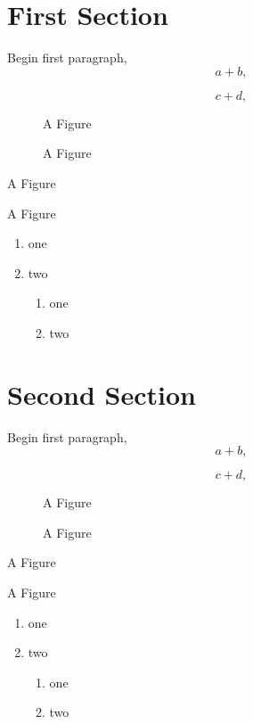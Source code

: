 \documentclass{article}
\begin{document}
\section{First Section}
Begin first paragraph,
\begin{equation}
 a + b,
\end{equation}

\begin{equation}
 c + d,
\end{equation}

\begin{figure}
A Figure
\caption{A Figure}
\end{figure}

\begin{table}
A Figure
\caption{A Figure}
\end{table}

\begin{enumerate}
 \item one
 \item two
   \begin{enumerate}
    \item one
    \item two
   \end{enumerate}
\end{enumerate}

\section{Second Section}
Begin first paragraph,
\begin{equation}
 a + b,
\end{equation}

\begin{equation}
 c + d,
\end{equation}

\begin{figure}
A Figure
\caption{A Figure}
\end{figure}

\begin{table}
A Figure
\caption{A Figure}
\end{table}

\begin{enumerate}
 \item one
 \item two
   \begin{enumerate}
    \item one
    \item two
   \end{enumerate}
\end{enumerate}
\end{document}
